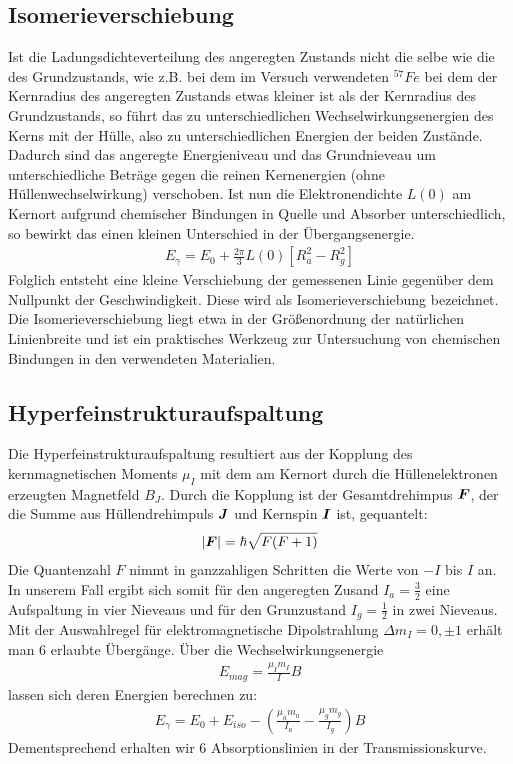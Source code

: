 \documentclass[12pt]{article}
\renewcommand*\vec[1]{{\mbox{\boldmath\ensuremath{#1}}}}
\begin{document}
\subsection{Isomerieverschiebung}
Ist die Ladungsdichteverteilung des angeregten Zustands nicht die selbe wie die des Grundzustands, wie z.B. bei dem im Versuch verwendeten $^{57}Fe$ bei dem der Kernradius
des angeregten Zustands etwas kleiner ist als der Kernradius des Grundzustands, so führt das zu unterschiedlichen Wechselwirkungsenergien des Kerns mit
der Hülle, also zu unterschiedlichen Energien der beiden Zustände. Dadurch sind das angeregte Energieniveau und das Grundnieveau um unterschiedliche Beträge gegen die
reinen Kernenergien (ohne Hüllenwechselwirkung) verschoben. Ist nun die Elektronendichte $L(0)$ am Kernort aufgrund chemischer Bindungen in Quelle und Absorber unterschiedlich,
so bewirkt das einen kleinen Unterschied in der Übergangsenergie.
\begin{align}
 E_\gamma = E_0 + \frac{2\pi}{3} L(0) \left[ R_a^2 - R_g^2\right]
\end{align}
Folglich entsteht eine kleine Verschiebung der gemessenen Linie gegenüber dem Nullpunkt der Geschwindigkeit. Diese wird als Isomerieverschiebung bezeichnet. Die Isomerieverschiebung
liegt etwa in der Größenordnung der natürlichen Linienbreite und ist ein praktisches Werkzeug zur Untersuchung von chemischen Bindungen in den verwendeten Materialien.

\subsection{Hyperfeinstrukturaufspaltung}
Die Hyperfeinstrukturaufspaltung resultiert aus der Kopplung des kernmagnetischen Moments $\mu_I$ mit dem am Kernort durch die Hüllenelektronen erzeugten Magnetfeld $B_J$.
Durch die Kopplung ist der Gesamtdrehimpus $\vec{F}$, der die Summe aus Hüllendrehimpuls $\vec{J}$ und Kernspin $\vec{I}$ ist, gequantelt:
\begin{align}
 \left|\vec{F}\right| = \hbar \sqrt{F(F+1)}
\end{align}
Die Quantenzahl $F$ nimmt in ganzzahligen Schritten die Werte von $-I$ bis $I$ an.
In unserem Fall ergibt sich somit für den angeregten Zusand $I_a = \frac{3}{2}$ eine Aufspaltung in vier Nieveaus und für den Grunzustand $I_g = \frac{1}{2}$ in zwei Nieveaus.
Mit der Auswahlregel für elektromagnetische Dipolstrahlung $\Delta m_I = 0, \pm 1$ erhält man $6$ erlaubte Übergänge. Über die Wechselwirkungsenergie
\begin{align}
 E_{mag} = \frac{\mu_I m_I}{I} B
\end{align}
lassen sich deren Energien berechnen zu:
\begin{align}
 E_\gamma = E_0 + E_{iso} - \left(\frac{\mu_a m_a}{I_a} - \frac{\mu_g m_g}{I_g} \right) B
\label{hfs}
\end{align}
Dementsprechend erhalten wir 6 Absorptionslinien in der Transmissionskurve.
\end{document}
